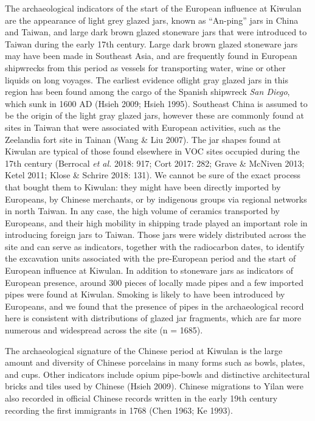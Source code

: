 \documentclass[]{article}
\begin{document}
The archaeological indicators of the start of the European influence at
Kiwulan are the appearance of light grey glazed jars, known as
``An-ping'' jars in China and Taiwan, and large dark brown glazed
stoneware jars that were introduced to Taiwan during the early 17th
century. Large dark brown glazed stoneware jars may have been made in
Southeast Asia, and are frequently found in European shipwrecks from
this period as vessels for transporting water, wine or other liquids on
long voyages. The earliest evidence oflight gray glazed jars in this
region has been found among the cargo of the Spanish shipwreck \emph{San
Diego}, which sunk in 1600 AD (Hsieh 2009; Hsieh 1995). Southeast China
is assumed to be the origin of the light gray glazed jars, however these
are commonly found at sites in Taiwan that were associated with European
activities, such as the Zeelandia fort site in Tainan (Wang \& Liu
2007). The jar shapes found at Kiwulan are typical of those found
elsewhere in VOC sites occupied during the 17th century (Berrocal
\emph{et al.} 2018: 917; Cort 2017: 282; Grave \& McNiven 2013; Ketel
2011; Klose \& Schrire 2018: 131). We cannot be sure of the exact
process that bought them to Kiwulan: they might have been directly
imported by Europeans, by Chinese merchants, or by indigenous groups via
regional networks in north Taiwan. In any case, the high volume of
ceramics transported by Europeans, and their high mobility in shipping
trade played an important role in introducing foreign jars to Taiwan.
Those jars were widely distributed across the site and can serve as
indicators, together with the radiocarbon dates, to identify the
excavation units associated with the pre-European period and the start
of European influence at Kiwulan. In addition to stoneware jars as
indicators of European presence, around 300 pieces of locally made pipes
and a few imported pipes were found at Kiwulan. Smoking is likely to
have been introduced by Europeans, and we found that the presence of
pipes in the archaeological record here is consistent with distributions
of glazed jar fragments, which are far more numerous and widespread
across the site (n = 1685).

The archaeological signature of the Chinese period at Kiwulan is the
large amount and diversity of Chinese porcelains in many forms such as
bowls, plates, and cups. Other indicators include opium pipe-bowls and
distinctive architectural bricks and tiles used by Chinese (Hsieh 2009).
Chinese migrations to Yilan were also recorded in official Chinese
records written in the early 19th century recording the first immigrants
in 1768 (Chen 1963; Ke 1993).
\end{document}
